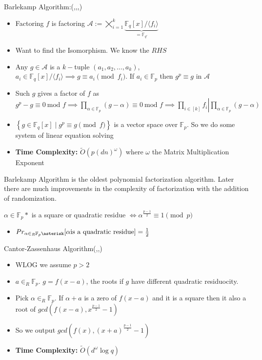 \documentclass[10pt]{beamer}
\begin{document}
\begin{frame}[allowframebreaks]
	{\large{Barlekamp Algorithm:}}({\cite{barlelargefield},\cite[Section 14.8]{gathenalgebra}},{\cite[Section 4.6.2]{knuthvol2}},\cite{ramalgcomp2017})
	\begin{itemize}
		\item Factoring $f$ is factoring $\mathcal{A}:=\bigtimes\limits_{i=1}^k \underbrace{\mathbb{F}_q[x]/\langle f_i\rangle}_{=\mathbb{F}_{q'}}$
		\item Want to find the Isomorphism. We know the $RHS$
		\item Any $g\in \mathcal{A}$ is a $k-$tuple $(a_1,a_2,\dots,a_k)$, $a_i\in \mathbb{F}_q[x]/\langle f_i\rangle\implies g\equiv a_i\pmod {f_i}$. If $a_i\in \mathbb{F}_p$ then $g^p\equiv g$ in $\mathcal{A}$
		\item Such $g$ gives a factor of $f$ as $g^p-g\equiv 0 \ \text{mod }f\implies \prod\limits_{\alpha\in \mathbb{F}_p}(g-\alpha)\equiv 0\ \text{mod }f	\implies \left. \prod_{i\in [k]}f_i\right| \prod\limits_{\alpha\in \mathbb{F}_p}(g-\alpha)$
		\item $\left\{ g\in \mathbb{F}_q[x]\mid g^p\equiv g\pmod f \right\}$ is a vector space over $\mathbb{F}_p$. So we do some system of linear equation solving
		\item \textbf{Time Complexity:} $\tilde{O}(p(dn)^{\omega})$ where $\omega$ the Matrix Multiplication Exponent
	\end{itemize}
	
	Barlekamp Algorithm is the oldest polynomial factorization algorithm. Later there are much improvements in the complexity of factorization with the addition  of randomization.
	\begin{theorem}
		$\alpha\in \mathbb{F}_p*$ is  a square or quadratic residue $\iff \alpha^{\frac{p-1}{2}}\equiv 1\pmod p$
	\end{theorem}
	\begin{itemize}
		\item $Pr_{\alpha\in_R \mathbb{F}_p\asterisk}[\alpha \text{is a quadratic residue}]=\frac12$
	\end{itemize}
	\vspace*{3mm}
	
	{\large{Cantor-Zassenhaus Algorithm}}(\cite[Section 14.3]{gathenalgebra},\cite{ramalgcomp2017},\cite{Zassenhaus1969OnHF})
	\begin{itemize}
		\item WLOG we assume $p>2$
		\item $a\in_R\mathbb{F}_p$. $g=f(x-a)$, the roots if $g$ have different quadratic residuocity.
		\item Pick $\alpha\in_R\mathbb{F}_p$. If $\alpha+a$ is a zero of $f(x-a)$ and it is a square then it also a root of $gcd(f(x-a),x^{\frac{p-1}{2}}-1)$
		\item So we output $gcd(f(x),(x+a)^{\frac{p-1}{2}}-1)$
		\item \textbf{Time Complexity:} $\tilde{O}(d^{\omega}\log q)$
	\end{itemize}
\end{frame}
\end{document}
